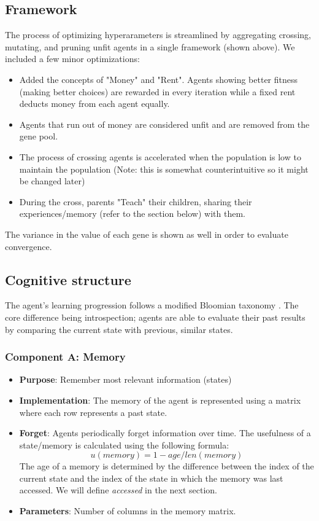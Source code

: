 \documentclass[12pt]{article}
\begin{document}
\subsection{Framework}

The process of optimizing hyperarameters is streamlined by aggregating crossing, mutating, and pruning unfit agents in a single framework (shown above).
We included a few minor optimizations:

\begin{itemize}
    \item Added the concepts of "Money" and "Rent". Agents showing better fitness (making better choices) are rewarded in every iteration while a fixed rent deducts money from each agent equally.
    \item Agents that run out of money are considered unfit and are removed from the gene pool.
    \item The process of crossing agents is accelerated when the population is low to maintain the population (Note: this is somewhat counterintuitive so it might be changed later)
    \item During the cross, parents "Teach" their children, sharing their experiences/memory (refer to the section below) with them.
\end{itemize}

The variance in the value of each gene is shown as well in order to evaluate convergence.

\subsection{Cognitive structure}

The agent's learning progression follows a modified Bloomian taxonomy \cite{anderson2001}. The core difference being introspection; agents are able to evaluate their past results by comparing the current state with previous, similar states.


\subsubsection{Component A: Memory}
\begin{itemize}
    \item \textbf{Purpose}: Remember most relevant information (states)
    \item \textbf{Implementation}: 
        The memory of the agent is represented using a matrix where each row represents
        a past state.
        \item \textbf{Forget}: Agents periodically forget information over time.
            The usefulness of a state/memory is calculated using the following formula:
        \begin{equation}
            u(memory) = 1 - age/len(memory)
        \end{equation}
        The age of a memory is determined by the difference between the index of the current state and the index of the
        state in which the memory was last accessed.
        We will define \emph{accessed} in the next section.
\item \textbf{Parameters}: Number of columns in the memory matrix.
\end{itemize}
\end{document}
